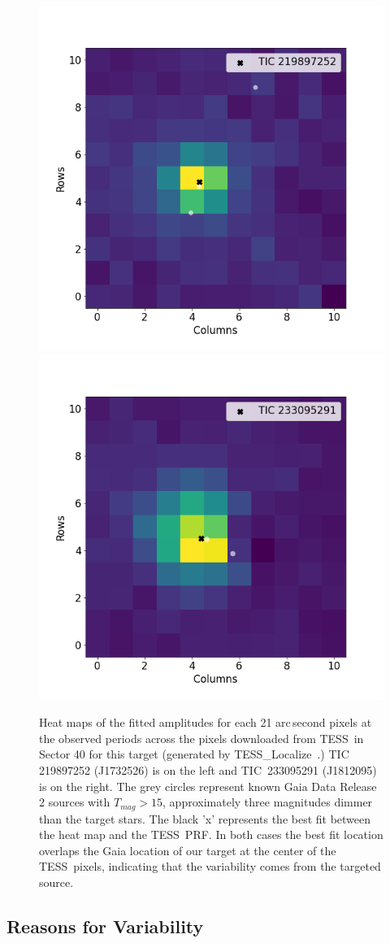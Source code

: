 \documentclass[twocolumn, linenumbers]{aastex631}
\newcommand{\tess}{TESS}
\newcommand{\tesslocalize}{{{\fontfamily{lmtt}\selectfont
\newcommand{\Msun}      {\>{\rm M_{\odot}}}
TESS\_Localize}}}
\begin{document}



\vspace{-1em}

\begin{figure}
\centering
\includegraphics[width=0.45\linewidth]{figures/TIC219897252_s040_5modes_tloc.png}
\includegraphics[width=0.45\linewidth]{figures/TIC233095291_s040_2modes_tloc.png}
\caption{Heat maps of the fitted amplitudes for each 21 arc\,second pixels at the observed periods across the pixels downloaded from \tess\ in Sector 40 for this target (generated by \tesslocalize\ \citealt{HiggensBell}.) TIC 219897252 (J1732526) is on the left and TIC~233095291 (J1812095) is on the right. The grey circles represent known Gaia Data Release 2 sources with $T_{mag} > 15$, approximately three magnitudes dimmer than the target stars. The black 'x' represents the best fit between the heat map and the \tess\ PRF. In both cases the best fit location overlaps the Gaia location of our target at the center of the \tess\ pixels, indicating that the variability comes from the targeted source.} 
\label{fig:cent}
\end{figure}

\subsection{Reasons for Variability} %
\end{document}
